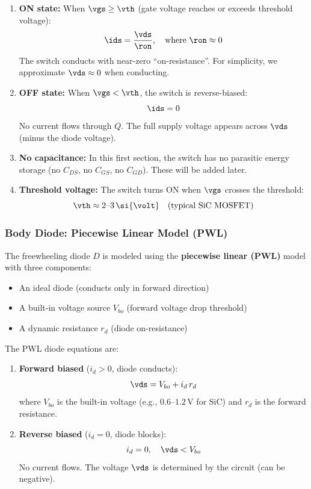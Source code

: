 \begin{enumerate}
    \item \textbf{ON state:} When $\vgs \geq \vth$ (gate voltage reaches or exceeds threshold voltage):
    \[
        \ids = \frac{\vds}{\ron}, \quad \text{where } \ron \approx 0
    \]
    The switch conducts with near-zero ``on-resistance''. For simplicity, we approximate $\vds \approx 0$ when conducting.

    \item \textbf{OFF state:} When $\vgs < \vth$, the switch is reverse-biased:
    \[
        \ids = 0
    \]
    No current flows through $Q$. The full supply voltage appears across $\vds$ (minus the diode voltage).

    \item \textbf{No capacitance:} In this first section, the switch has no parasitic energy storage (no $C_{DS}$, no $C_{GS}$, no $C_{GD}$). These will be added later.

    \item \textbf{Threshold voltage:} The switch turns ON when $\vgs$ crosses the threshold:
    \[
        \vth \approx 2\text{--}3\,\si{\volt} \quad \text{(typical SiC MOSFET)}
    \]
\end{enumerate}

\subsubsection{Body Diode: Piecewise Linear Model (PWL)}

The freewheeling diode $D$ is modeled using the \textbf{piecewise linear (PWL)} model with three components:
\begin{itemize}
    \item An ideal diode (conducts only in forward direction)
    \item A built-in voltage source $V_{bo}$ (forward voltage drop threshold)
    \item A dynamic resistance $r_d$ (diode on-resistance)
\end{itemize}

The PWL diode equations are:

\begin{enumerate}
    \item \textbf{Forward biased} ($i_d > 0$, diode conducts):
    \[
        \vds = V_{bo} + i_d \, r_d
    \]
    where $V_{bo}$ is the built-in voltage (e.g., $0.6\text{--}1.2\,\si{\volt}$ for SiC) and $r_d$ is the forward resistance.

    \item \textbf{Reverse biased} ($i_d = 0$, diode blocks):
    \[
        i_d = 0, \quad \vds < V_{bo}
    \]
    No current flows. The voltage $\vds$ is determined by the circuit (can be negative).
\end{enumerate}

